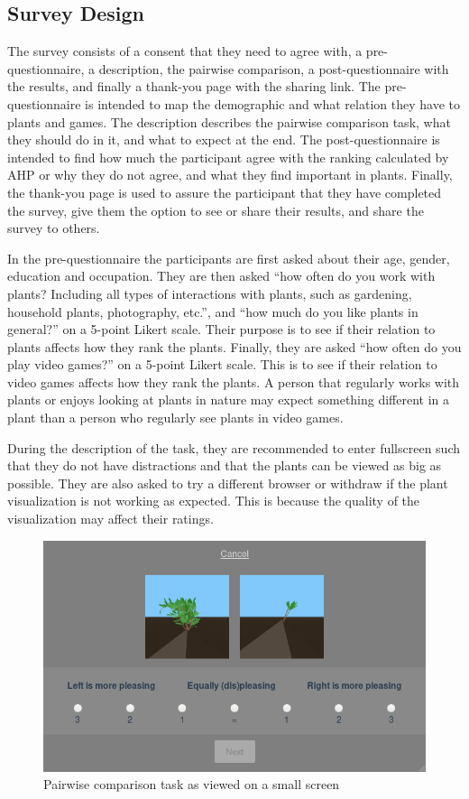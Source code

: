 \subsection{Survey Design}
The survey consists of a consent that they need to agree with, a pre-questionnaire, a description, the pairwise comparison, a post-questionnaire with the results, and finally a thank-you page with the sharing link.
The pre-questionnaire is intended to map the demographic and what relation they have to plants and games.
The description describes the pairwise comparison task, what they should do in it, and what to expect at the end.
The post-questionnaire is intended to find how much the participant agree with the ranking calculated by AHP or why they do not agree, and what they find important in plants.
Finally, the thank-you page is used to assure the participant that they have completed the survey, give them the option to see or share their results, and share the survey to others.

In the pre-questionnaire the participants are first asked about their age, gender, education and occupation.
They are then asked ``how often do you work with plants? Including all types of interactions with plants, such as gardening, household plants, photography, etc.'', and ``how much do you like plants in general?'' on a 5-point Likert scale.
Their purpose is to see if their relation to plants affects how they rank the plants.
Finally, they are asked ``how often do you play video games?'' on a 5-point Likert scale.
This is to see if their relation to video games affects how they rank the plants.
A person that regularly works with plants or enjoys looking at plants in nature may expect something different in a plant than a person who regularly see plants in video games.

During the description of the task, they are recommended to enter fullscreen such that they do not have distractions and that the plants can be viewed as big as possible.
They are also asked to try a different browser or withdraw if the plant visualization is not working as expected.
This is because the quality of the visualization may affect their ratings.

\begin{figure}
    \centering
    \includegraphics[width=1.0\textwidth]{figures/pairwise}
    \caption{Pairwise comparison task as viewed on a small screen}
    \label{fig:pairwise}
\end{figure}

